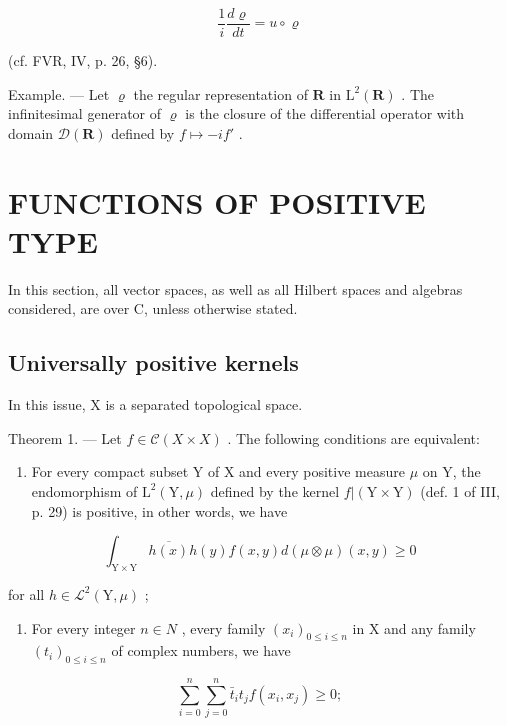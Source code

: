 \[
\frac {1}{i} \frac {d \varrho}{d t} = u \circ \varrho
\]

(cf. FVR, IV, p. 26, §6).

Example. --- Let \(\varrho\) the regular representation of \(\mathbf{R}\) in \(\mathrm{L}^2 (\mathbf{R})\) . The infinitesimal generator of \(\varrho\) is the closure of the differential operator with domain \(\mathcal{D}(\mathbf{R})\) defined by \(f\mapsto -if'\) .

\section{FUNCTIONS OF POSITIVE TYPE}

In this section, all vector spaces, as well as all Hilbert spaces and algebras considered, are over C, unless otherwise stated.

\subsection{Universally positive kernels}

In this issue, X is a separated topological space.

Theorem 1. --- Let \(f \in \mathcal{C}(X \times X)\) . The following conditions are equivalent:

\begin{enumerate}
\def\labelenumi{(\roman{enumi})}
\tightlist
\item
  For every compact subset Y of X and every positive measure \(\mu\) on Y, the endomorphism of \(\mathrm{L}^{2}(\mathrm{Y},\mu)\) defined by the kernel \(f|(\mathrm{Y}\times\mathrm{Y})\) (def. 1 of III, p. 29) is positive, in other words, we have
\end{enumerate}

\[
\int_ {\mathrm{Y} \times \mathrm{Y}} \overline {{h (x)}} h (y) f (x, y) d (\mu \otimes \mu) (x, y) \geqslant 0
\]

for all \(h \in \mathcal{L}^{2}(\mathrm{Y}, \mu)\) ;

\begin{enumerate}
\def\labelenumi{(\roman{enumi})}
\setcounter{enumi}{1}
\tightlist
\item
  For every integer \(n \in N\) , every family \((x_{i})_{0 \leqslant i \leqslant n}\) in X and any family \((t_{i})_{0 \leqslant i \leqslant n}\) of complex numbers, we have
\end{enumerate}

\[
\sum_ {i = 0} ^ {n} \sum_ {j = 0} ^ {n} \bar {t} _ {i} t _ {j} f (x _ {i}, x _ {j}) \geqslant 0;
\]


